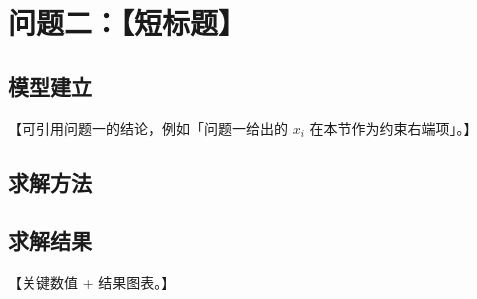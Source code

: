 \section{问题二：【短标题】}

\subsection{模型建立}

【可引用问题一的结论，例如「问题一给出的 $x_i$ 在本节作为约束右端项」。】

\subsection{求解方法}

\subsection{求解结果}

【关键数值 + 结果图表。】
